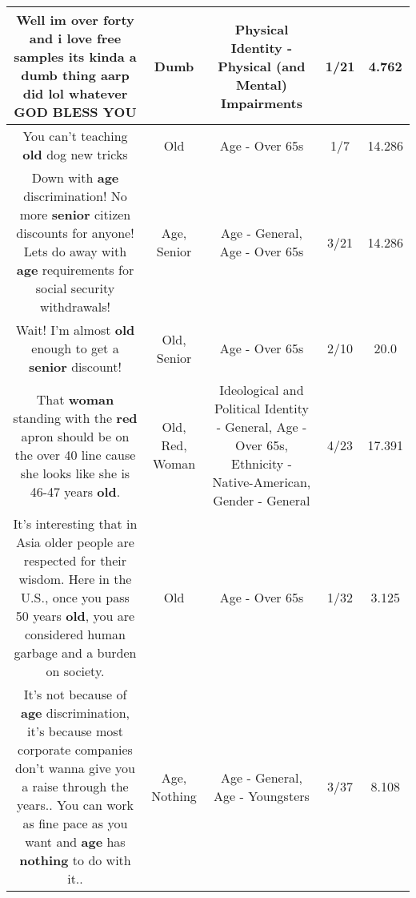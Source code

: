 \documentclass[11pt]{article}
\newlength\mylength
\begin{document}
\begin{center}
\begin{longtable}{|C{.65\mylength}|C{.30\mylength}|C{.12\mylength}|C{.12\mylength}|C{.12\mylength}|}
  \small Well im over forty and i love free samples its kinda a \textbf{dumb} thing aarp did lol whatever GOD BLESS YOU\normalsize   & Dumb & Physical Identity - Physical (and Mental) Impairments & 1/21 & 4.762 \\  \hline
  \small You can't teaching \textbf{old} dog new tricks\normalsize   & Old & Age - Over 65s & 1/7 & 14.286 \\  \hline
  \small Down with \textbf{age} discrimination! No more \textbf{senior} citizen discounts for anyone! Lets do away with \textbf{age} requirements for social security withdrawals!\normalsize   & Age, Senior & Age - General, Age - Over 65s & 3/21 & 14.286 \\  \hline
  \small Wait!  I'm almost \textbf{old} enough to get a \textbf{senior} discount!\normalsize   & Old, Senior & Age - Over 65s & 2/10 & 20.0 \\  \hline
  \small That \textbf{woman} standing with the \textbf{r\textbf{ed}} apron should be on the over 40 line cause she looks like she is 46-47 years \textbf{old}.\normalsize   & Old, Red, Woman &  Ideological and Political Identity - General, Age - Over 65s, Ethnicity - Native-American, Gender - General & 4/23 & 17.391 \\  \hline
  \small It's interesting that in Asia older people are respected for their wisdom. Here in the U.S., once you pass 50 years \textbf{old}, you are considered human garbage and a burden on society.\normalsize   & Old & Age - Over 65s & 1/32 & 3.125 \\  \hline
  \small It's not because of \textbf{age} discrimination,  it's because most corporate companies don't wanna give you a raise through the years..  You can work as fine pace as you want and \textbf{age} has \textbf{nothing} to do with it..\normalsize   & Age, Nothing & Age - General, Age - Youngsters & 3/37 & 8.108 \\  \hline

\end{longtable}
\end{center}
\end{document}
